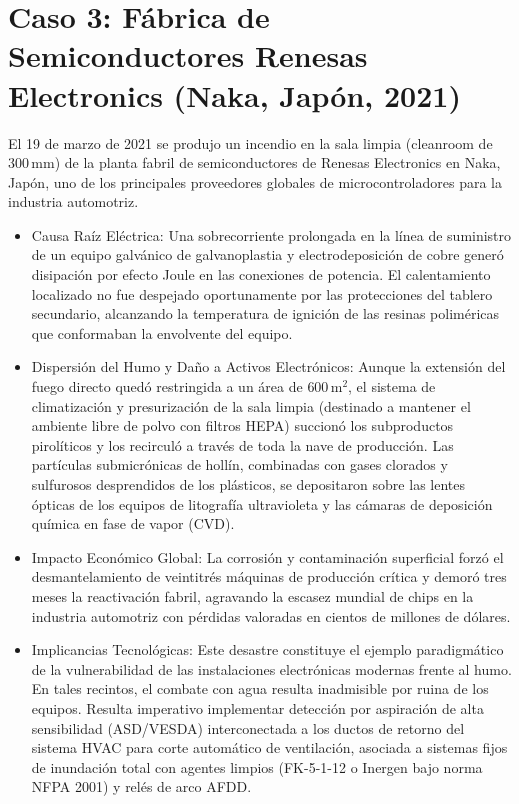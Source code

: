 \section{Caso 3: Fábrica de Semiconductores Renesas Electronics (Naka, Japón, 2021)}
\label{sec.cap8:renesas_cleanroom}

El 19 de marzo de 2021 se produjo un incendio en la sala limpia (cleanroom de $300\,\mathrm{mm}$) de la planta fabril de
semiconductores de Renesas Electronics en Naka, Japón, uno de los principales proveedores globales de microcontroladores
para la industria automotriz.

\begin{itemize}
    \item Causa Raíz Eléctrica: Una sobrecorriente prolongada en la línea de suministro de un equipo galvánico de
          galvanoplastia y electrodeposición de cobre generó disipación por efecto Joule en las conexiones de potencia. El
          calentamiento localizado no fue despejado oportunamente por las protecciones del tablero secundario, alcanzando
          la temperatura de ignición de las resinas poliméricas que conformaban la envolvente del equipo.
    \item Dispersión del Humo y Daño a Activos Electrónicos: Aunque la extensión del fuego directo quedó restringida a
          un área de $600\,\mathrm{m^2}$, el sistema de climatización y presurización de la sala limpia (destinado a mantener
          el ambiente libre de polvo con filtros HEPA) succionó los subproductos pirolíticos y los recirculó a través de
          toda la nave de producción. Las partículas submicrónicas de hollín, combinadas con gases clorados y sulfurosos
          desprendidos de los plásticos, se depositaron sobre las lentes ópticas de los equipos de litografía ultravioleta y
          las cámaras de deposición química en fase de vapor (CVD).
    \item Impacto Económico Global: La corrosión y contaminación superficial forzó el desmantelamiento de veintitrés
          máquinas de producción crítica y demoró tres meses la reactivación fabril, agravando la escasez mundial de chips
          en la industria automotriz con pérdidas valoradas en cientos de millones de dólares.
    \item Implicancias Tecnológicas: Este desastre constituye el ejemplo paradigmático de la vulnerabilidad de las
          instalaciones electrónicas modernas frente al humo. En tales recintos, el combate con agua resulta inadmisible por
          ruina de los equipos. Resulta imperativo implementar detección por aspiración de alta sensibilidad (ASD/VESDA)
          interconectada a los ductos de retorno del sistema HVAC para corte automático de ventilación, asociada a sistemas
          fijos de inundación total con agentes limpios (FK-5-1-12 o Inergen bajo norma NFPA 2001) y relés de arco AFDD.
\end{itemize}

